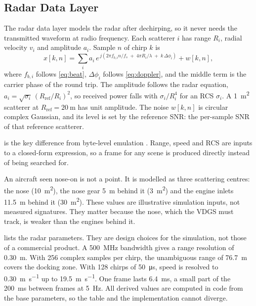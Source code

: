 \documentclass[conference]{IEEEtran}
\begin{document}
\subsection{Radar Data Layer}
\label{sec:radar-layer}
The radar data layer models the radar after dechirping, so it never needs the transmitted waveform at radio frequency. Each scatterer $i$ has range $R_i$, radial velocity $v_i$ and amplitude $a_i$. Sample $n$ of chirp $k$ is
\begin{equation}
  x[k,n] = \sum_i a_i \, e^{\,j\left(2\pi f_{b,i} n / f_s \;+\; 4\pi R_i/\lambda \;+\; k\,\Delta\phi_i\right)} + w[k,n],
  \label{eq:signal}
\end{equation}
where $f_{b,i}$ follows \cref{eq:beat}, $\Delta\phi_i$ follows \cref{eq:doppler}, and the middle term is the carrier phase of the round trip. The amplitude follows the radar equation, $a_i = \sqrt{\sigma_i}\,(R_\text{ref}/R_i)^2$, so received power falls with $\sigma_i/R_i^4$ for an RCS $\sigma_i$. A \SI{1}{\square\metre} scatterer at $R_\text{ref} = \SI{20}{\metre}$ has unit amplitude. The noise $w[k,n]$ is circular complex Gaussian, and its level is set by the reference SNR: the per-sample SNR of that reference scatterer.

 is the key difference from byte-level emulation \cite{khalil2020radar}. Range, speed and RCS are inputs to a closed-form expression, so a frame for any scene is produced directly instead of being searched for.

An aircraft seen nose-on is not a point. It is modelled as three scattering centres: the nose (\SI{10}{\square\metre}), the nose gear \SI{5}{\metre} behind it (\SI{3}{\square\metre}) and the engine inlets \SI{11.5}{\metre} behind it (\SI{30}{\square\metre}). These values are illustrative simulation inputs, not measured signatures. They matter because the nose, which the VDGS must track, is weaker than the engines behind it.

 lists the radar parameters. They are design choices for the simulation, not those of a commercial product. A \SI{500}{\mega\hertz} bandwidth gives a range resolution of \SI{0.30}{\metre}. With 256 complex samples per chirp, the unambiguous range of \SI{76.7}{\metre} covers the docking zone. With 128 chirps of \SI{50}{\micro\second}, speed is resolved to \SI{0.30}{\metre\per\second} up to \SI{19.5}{\metre\per\second}. One frame lasts \SI{6.4}{\milli\second}, a small part of the \SI{200}{\milli\second} between frames at \SI{5}{\hertz}. All derived values are computed in code from the base parameters, so the table and the implementation cannot diverge.
\end{document}
